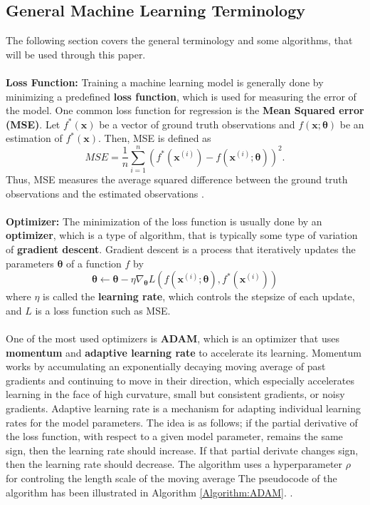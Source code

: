\documentclass[./main.tex]{subfiles}
\begin{document}
\subsection{General Machine Learning Terminology}
\label{sec:GMLT}
The following section covers the general terminology and some algorithms, that will be used through this paper. 
\\
\\
\noindent \textbf{Loss Function:} Training a machine learning model is generally done by minimizing a predefined \textbf{loss function}, which is used for measuring the error of the model. One common loss function for regression is the \textbf{Mean Squared error (MSE)}. Let $f^*(\bm{x})$ be a vector of ground truth observations and $f(\bm{x}; \bm{\theta})$ be an estimation of $f^*(\bm{x})$. Then, MSE is defined as
\begin{equation}
    MSE = \frac{1}{n} \sum_{i = 1} ^n \left( f^*\left(\bm{x}^{(i)}\right) - f\left(\bm{x}^{(i)}; \bm{\theta}\right)\right)^2.
\end{equation}
Thus, MSE measures the average squared difference between the ground truth observations and the estimated observations \cite{ISL}.
\\
\\
\noindent \textbf{Optimizer:} The minimization of the loss function is usually done by an \textbf{optimizer}, which is a type of algorithm, that is typically some type of variation of \textbf{gradient descent}. Gradient descent is a process that iteratively updates the parameters $\bm{\theta}$ of a function $f$ by
\begin{equation}
    \bm{\theta} \leftarrow \bm{\theta} - \eta \nabla_{\bm{\theta}} L\left( f\left(\bm{x}^{(i)}; \bm{\theta}\right), f^*\left(\bm{x}^{(i)}\right) \right)
\end{equation}
where $\eta$ is called the \textbf{learning rate}, which controls the stepsize of each update, and $L$ is a loss function such as MSE.
\\
\\
One of the most used optimizers is \textbf{ADAM}, which is an optimizer that uses \textbf{momentum} and \textbf{adaptive learning rate} to accelerate its learning. Momentum works by accumulating an exponentially decaying moving average of past gradients and continuing to move in their direction, which especially accelerates learning in the face of high curvature, small but consistent gradients, or noisy gradients. Adaptive learning rate is a mechanism for adapting individual learning rates for the model parameters. The idea is as follows; if the partial derivative of the loss function, with respect to a given model parameter, remains the same sign, then the learning rate should increase. If that partial derivate changes sign, then the learning rate should decrease. The algorithm uses a hyperparameter $\rho$ for controling the length scale of the moving average The pseudocode of the algorithm has been illustrated in Algorithm \ref{Algorithm:ADAM}. \cite{DL_book}. 
\end{document}
